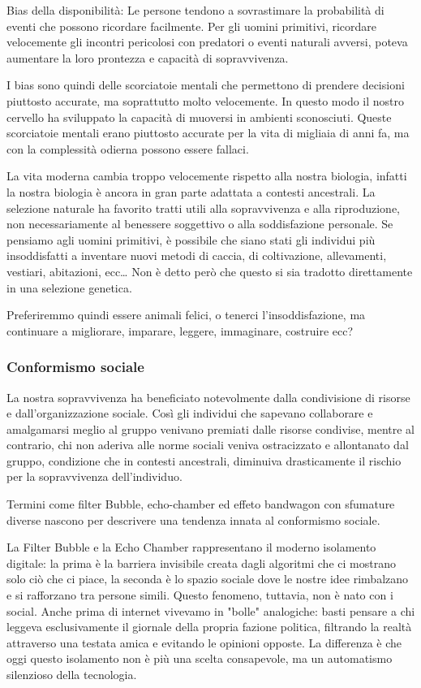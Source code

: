 \documentclass[12pt]{book} %
\begin{document}
Bias della disponibilità: Le persone tendono a sovrastimare la probabilità di eventi che possono ricordare facilmente.
Per gli uomini primitivi, ricordare velocemente gli incontri pericolosi con predatori o eventi naturali avversi, poteva aumentare la loro prontezza e capacità di sopravvivenza.

I bias sono quindi delle scorciatoie mentali che permettono di prendere decisioni piuttosto accurate, ma soprattutto molto velocemente. In questo modo il nostro cervello ha sviluppato la capacità di muoversi in ambienti sconosciuti.
Queste scorciatoie mentali erano piuttosto accurate per la vita di migliaia di anni fa, ma con la complessità odierna possono essere fallaci.

La vita moderna cambia troppo velocemente rispetto alla nostra biologia, infatti la nostra biologia è ancora in gran parte adattata a contesti ancestrali. 
La selezione naturale ha favorito tratti utili alla sopravvivenza e alla riproduzione, non necessariamente al benessere soggettivo o alla soddisfazione personale. 
Se pensiamo agli uomini primitivi, è possibile che siano stati gli individui più insoddisfatti a inventare nuovi metodi di caccia, di coltivazione, allevamenti, vestiari, abitazioni, ecc… Non è detto però che questo si sia tradotto direttamente in una selezione genetica.

Preferiremmo quindi essere animali felici, o tenerci l'insoddisfazione, ma continuare a migliorare, imparare, leggere, immaginare, costruire ecc? 

\subsubsection{Conformismo sociale}
La nostra sopravvivenza ha beneficiato notevolmente dalla condivisione di risorse e dall’organizzazione sociale. 
Così gli individui che sapevano collaborare e amalgamarsi meglio al gruppo venivano premiati dalle risorse condivise, mentre al contrario, chi non aderiva alle norme sociali veniva ostracizzato e allontanato dal gruppo, condizione che in contesti ancestrali, diminuiva drasticamente il rischio per la sopravvivenza dell'individuo.

Termini come filter Bubble, echo-chamber ed effeto bandwagon con sfumature diverse nascono per descrivere una tendenza innata al conformismo sociale.

La Filter Bubble e la Echo Chamber rappresentano il moderno isolamento digitale: la prima è la barriera invisibile creata dagli algoritmi che ci mostrano solo ciò che ci piace, la seconda è lo spazio sociale dove le nostre idee rimbalzano e si rafforzano tra persone simili.
Questo fenomeno, tuttavia, non è nato con i social. Anche prima di internet vivevamo in "bolle" analogiche: basti pensare a chi leggeva esclusivamente il giornale della propria fazione politica, filtrando la realtà attraverso una testata amica e evitando le opinioni opposte. La differenza è che oggi questo isolamento non è più una scelta consapevole, ma un automatismo silenzioso della tecnologia.
\end{document}

